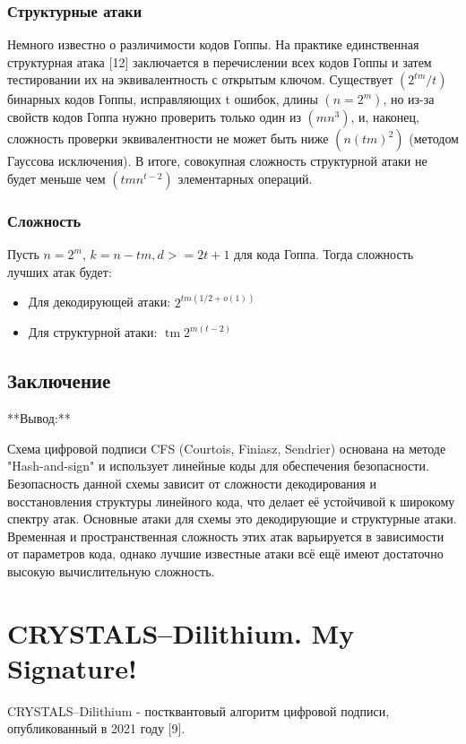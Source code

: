 \documentclass[colorthm]{./civarticle}
\begin{document}
\subsubsection{Структурные атаки}
Немного известно о различимости кодов Гоппы. На практике единственная структурная атака [12] заключается в перечислении всех кодов Гоппы и затем тестировании их на эквивалентность с открытым ключом. Существует $(2^{tm}/t)$ бинарных кодов Гоппы, исправляющих t ошибок, длины $(n = 2^m)$, но из-за свойств кодов Гоппа нужно проверить только один из $(mn^3)$, и, наконец, сложность проверки эквивалентности не может быть ниже $(n(tm)^2)$ (методом Гауссова исключения). В итоге, совокупная сложность структурной атаки не будет меньше чем $(tmn^{t-2})$ элементарных операций.

\subsubsection{Сложность}
Пусть $n=2^m$, $k=n-tm, d>=2t+1$ для кода Гоппа. Тогда сложность лучших атак будет:

\begin{itemize}
    \item Для декодирующей атаки: $2^{t m(1 / 2+o(1))}$
    \item Для структурной атаки: $\operatorname{tm} 2^{m(t-2)}$
\end{itemize}

\subsection{Заключение}
**Вывод:**

Схема цифровой подписи CFS (Courtois, Finiasz, Sendrier) основана на методе "Hash-and-sign" и использует линейные коды для обеспечения безопасности. Безопасность данной схемы зависит от сложности декодирования и восстановления структуры линейного кода, что делает её устойчивой к широкому спектру атак. Основные атаки для схемы это декодирующие и структурные атаки. Временная и пространственная сложность этих атак варьируется в зависимости от параметров кода, однако лучшие известные атаки всё ещё имеют достаточно высокую вычислительную сложность.

\section{CRYSTALS–Dilithium. My Signature!}
CRYSTALS–Dilithium - постквантовый алгоритм цифровой подписи, опубликованный в 2021 году [9].
\end{document}

